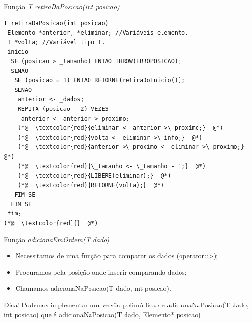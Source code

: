 \documentclass[12pt,table,xcolor={dvipsnames}]{beamer}
\begin{document}
\begin{frame}[fragile]{Função \textit{T retiraDaPosicao(int posicao)}}
\begin{lstlisting}
T retiraDaPosicao(int posicao)
 Elemento *anterior, *eliminar; //Variáveis elemento.
 T *volta; //Variável tipo T.
 inicio
  SE (posicao > _tamanho) ENTAO THROW(ERROPOSICAO);
  SENAO
   SE (posicao = 1) ENTAO RETORNE(retiraDoInicio());
   SENAO
    anterior <- _dados;
    REPITA (posicao - 2) VEZES
     anterior <- anterior->_proximo;
    (*@  \textcolor{red}{eliminar <- anterior->\_proximo;}  @*)
    (*@  \textcolor{red}{volta <- eliminar->\_info;}  @*)
    (*@  \textcolor{red}{anterior->\_proximo <- eliminar->\_proximo;}  @*)
    (*@  \textcolor{red}{\_tamanho <- \_tamanho - 1;}  @*)
    (*@  \textcolor{red}{LIBERE(eliminar);}  @*)
    (*@  \textcolor{red}{RETORNE(volta);}  @*)
   FIM SE
  FIM SE
 fim;
(*@  \textcolor{red}{}  @*)
\end{lstlisting}
\end{frame}

\begin{frame}[fragile]{Função \textit{adicionaEmOrdem(T dado)}}
\begin{itemize}
\item Necessitamos de uma função para comparar os dados (operator::>);
\item Procuramos pela posição onde inserir comparando dados;
\item Chamamos adicionaNaPosicao(T dado, int posicao).
\end{itemize}
\begin{block}{Dica!}
Podemos implementar um versão polimórfica de adicionaNaPosicao(T dado, int posicao) que é adicionaNaPosicao(T dado, Elemento* posicao)
\end{block}
\end{frame}
\end{document}
